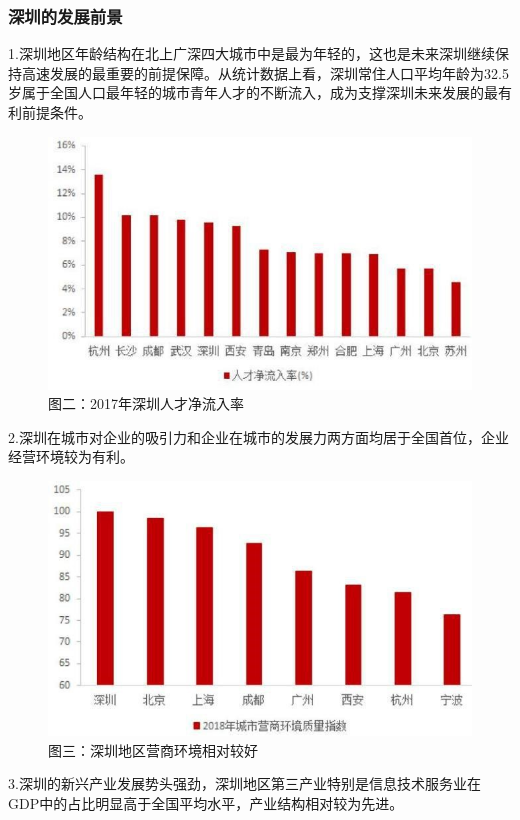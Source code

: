 \documentclass{article}
\begin{document}
\subsubsection{深圳的发展前景}
1.深圳地区年龄结构在北上广深四大城市中是最为年轻的，这也是未来深圳继续保持高速发展的最重要的前提保障。从统计数据上看，深圳常住人口平均年龄为32.5岁属于全国人口最年轻的城市青年人才的不断流入，成为支撑深圳未来发展的最有利前提条件。

\begin{figure}[h!]
\centering
\includegraphics[scale=0.5]{2}
\caption{ 图二：2017年深圳人才净流入率 }
\label{fig:2}
\end{figure}

2.深圳在城市对企业的吸引力和企业在城市的发展力两方面均居于全国首位，企业经营环境较为有利。

\begin{figure}[h!]
\centering
\includegraphics[scale=0.5]{3}
\caption{  图三：深圳地区营商环境相对较好 }
\label{fig:3}
\end{figure}
3.深圳的新兴产业发展势头强劲，深圳地区第三产业特别是信息技术服务业在GDP中的占比明显高于全国平均水平，产业结构相对较为先进。
\end{document}
